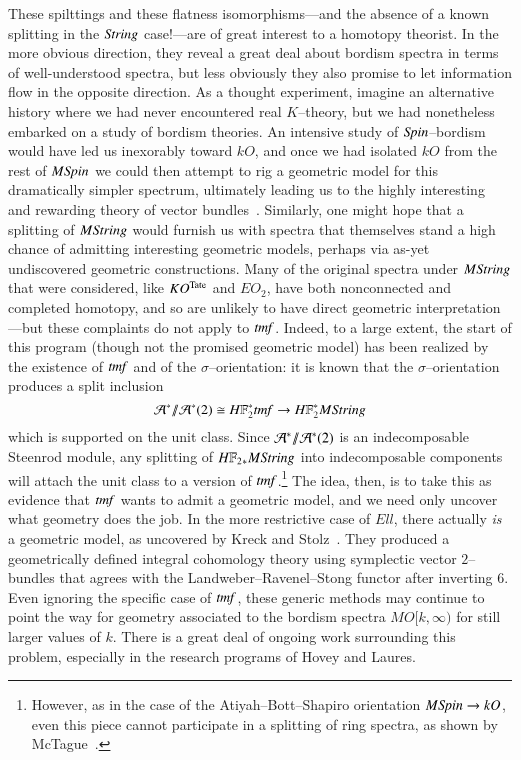 These spilttings and these flatness isomorphisms---and the absence of a known splitting in the $\mathit{String}$ case!---are of great interest to a homotopy theorist.  In the more obvious direction, they reveal a great deal about bordism spectra in terms of well-understood spectra, but less obviously they also promise to let information flow in the opposite direction.  As a thought experiment, imagine an alternative history where we had never encountered real $K$--theory, but we had nonetheless embarked on a study of bordism theories.  An intensive study of $\mathit{Spin}$--bordism would have led us inexorably toward $kO$, and once we had isolated $kO$ from the rest of $M\mathit{Spin}$ we could then attempt to rig a geometric model for this dramatically simpler spectrum, ultimately leading us to the highly interesting and rewarding theory of vector bundles~\cite[pg.\ 338]{HoveyVnEltsOfRings}.  Similarly, one might hope that a splitting of $M\mathit{String}$ would furnish us with spectra that themselves stand a high chance of admitting interesting geometric models, perhaps via as-yet undiscovered geometric constructions.  Many of the original spectra under $M\mathit{String}$ that were considered, like $KO^{\mathrm{Tate}}$ and $EO_2$, have both nonconnected and completed homotopy, and so are unlikely to have direct geometric interpretation---but these complaints do not apply to $\mathit{tmf}$.  Indeed, to a large extent, the start of this program (though not the promised geometric model) has been realized by the existence of $\mathit{tmf}$ and of the $\sigma$--orientation: it is known that the $\sigma$--orientation produces a split inclusion \[\mathcal A^* \mmod \mathcal A^*(2) \cong \HFtwo^* \tmf \to \HFtwo^* M\String\] which is supported on the unit class.  Since $\mathcal A^* /\!\!/ \mathcal A^*(2)$ is an indecomposable Steenrod module, any splitting of $\HFtwo_* M\String$ into indecomposable components will attach the unit class to a version of $\mathit{tmf}$.\footnote{However, as in the case of the Atiyah--Bott--Shapiro orientation $M\mathit{Spin} \to kO$, even this piece cannot participate in a splitting of ring spectra, as shown by McTague~\cite{McTague}.}  The idea, then, is to take this as evidence that $\mathit{tmf}$ wants to admit a geometric model, and we need only uncover what geometry does the job.  In the more restrictive case of $\mathit{Ell}$, there actually \emph{is} a geometric model, as uncovered by Kreck and Stolz~\cite{KreckStolz}.  They produced a geometrically defined integral cohomology theory using symplectic vector $2$--bundles that agrees with the Landweber--Ravenel--Stong functor after inverting $6$.  Even ignoring the specific case of $\mathit{tmf}$, these generic methods may continue to point the way for geometry associated to the bordism spectra $MO[k, \infty)$ for still larger values of $k$.  There is a great deal of ongoing work surrounding this problem, especially in the research programs of Hovey and Laures.

